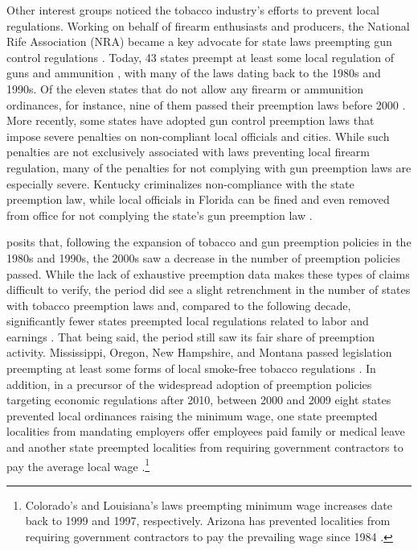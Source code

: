 \documentclass[12pt]{article}
\begin{document}
Other interest groups noticed the tobacco industry's efforts to prevent local regulations. Working on behalf of firearm enthusiasts and producers, the National Rife Association (NRA) became a key advocate for state laws preempting gun control regulations \parencite{hicksHomeRuleBe2018}. Today, 43 states preempt at least some local regulation of guns and ammunition \parencite{giffordslawcenterPreemptionLocalLawsn.d.,schraggerStatePreemptionLocal2017}, with many of the laws dating back to the 1980s and 1990s. Of the eleven states that do not allow any firearm or ammunition ordinances, for instance, nine of them passed their preemption laws before 2000 \parencite{schraggerStatePreemptionLocal2017}. More recently, some states have adopted gun control preemption laws that impose severe penalties on non-compliant local officials and cities. While such penalties are not exclusively associated with laws preventing local firearm regulation, many of the penalties for not complying with gun preemption laws are especially severe. Kentucky criminalizes non-compliance with the state preemption law, while local officials in Florida can be fined and even removed from office for not complying the state's gun preemption law \parencite{briffaultChallengeNewPreemption2018}.

\textcite{hicksHomeRuleBe2018} posits that, following the expansion of tobacco and gun preemption policies in the 1980s and 1990s, the 2000s saw a decrease in the number of preemption policies passed. While the lack of exhaustive preemption data makes these types of claims difficult to verify, the period did see a slight retrenchment in the number of states with tobacco preemption laws and, compared to the following decade, significantly fewer states preempted local regulations related to labor and earnings \parencite{centersfordiseasecontrolStatePreemptionLocal2010,vonwilpertCityGovernmentsAre2017}. That being said, the period still saw its fair share of preemption activity. Mississippi, Oregon, New Hampshire, and Montana passed legislation preempting at least some forms of local smoke-free tobacco regulations \parencite{centersfordiseasecontrolPreemptiveStateSmokeFree2005}. In addition, in a precursor of the widespread adoption of preemption policies targeting economic regulations after 2010, between 2000 and 2009 eight states prevented local ordinances raising the minimum wage, one state preempted localities from mandating employers offer employees paid family or medical leave and another state preempted localities from requiring government contractors to pay the average local wage \parencite{vonwilpertCityGovernmentsAre2017}.\footnote{Colorado's and Louisiana's laws preempting minimum wage increases date back to 1999 and 1997, respectively. Arizona has prevented localities from requiring government contractors to pay the prevailing wage since 1984 \parencite{economicpolicyinstituteWorkerRightsPreemption2018}.}
\end{document}
